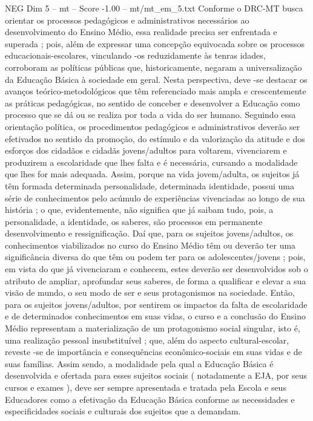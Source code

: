 \begin{textsample}{NEG Dim 5 – mt – Score -1.00 – mt/mt\_em\_5.txt}
Conforme o DRC-MT busca orientar os processos pedagógicos e administrativos necessários ao desenvolvimento do Ensino Médio, essa realidade precisa ser enfrentada e superada ; pois, além de expressar uma concepção equivocada sobre os processos educacionais-escolares, vinculando -os reduzidamente às tenras idades, corroboram as políticas públicas que, historicamente, negaram a universalização da Educação Básica à sociedade em geral.
Nesta perspectiva, deve -se destacar os avanços teórico-metodológicos que têm referenciado mais ampla e crescentemente as práticas pedagógicas, no sentido de conceber e desenvolver a Educação como processo que se dá ou se realiza por toda a vida do ser humano.
Seguindo essa orientação política, os procedimentos pedagógicos e administrativos deverão ser efetivados no sentido da promoção, do estímulo e da valorização da atitude e dos esforços dos cidadãos e cidadãs jovens/adultos para voltarem, vivenciarem e produzirem a escolaridade que lhes falta e é necessária, cursando a modalidade que lhes for mais adequada.
Assim, porque na vida jovem/adulta, os sujeitos já têm formada determinada personalidade, determinada identidade, possui uma série de conhecimentos pelo acúmulo de experiências vivenciadas ao longo de sua história ; o que, evidentemente, não significa que já saibam tudo, pois, a personalidade, a identidade, os saberes, são processos em permanente desenvolvimento e ressignificação.
Daí que, para os sujeitos jovens/adultos, os conhecimentos viabilizados no curso do Ensino Médio têm ou deverão ter uma significância diversa do que têm ou podem ter para os adolescentes/jovens ; pois, em vista do que já vivenciaram e conhecem, estes deverão ser desenvolvidos sob o atributo de ampliar, aprofundar seus saberes, de forma a qualificar e elevar a sua visão de mundo, o seu modo de ser e seus protagonismos na sociedade.
Então, para os sujeitos jovens/adultos, por sentirem os impactos da falta de escolaridade e de determinados conhecimentos em suas vidas, o curso e a conclusão do Ensino Médio representam a materialização de um protagonismo social singular, isto é, uma realização pessoal insubstituível ; que, além do aspecto cultural-escolar, reveste -se de importância e consequências econômico-sociais em suas vidas e de suas famílias.
Assim sendo, a modalidade pela qual a Educação Básica é desenvolvida e ofertada para esses sujeitos sociais ( notadamente a EJA, por seus cursos e exames ), deve ser sempre apresentada e tratada pela Escola e seus Educadores como a efetivação da Educação Básica conforme as necessidades e especificidades sociais e culturais dos sujeitos que a demandam.

\end{textsample}
